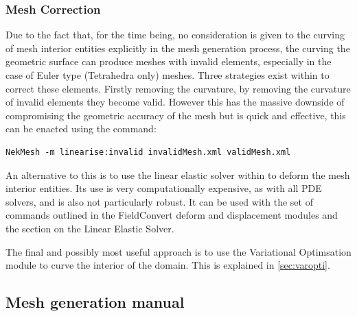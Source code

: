 \subsubsection{Mesh Correction}

Due to the fact that, for the time being, no consideration is given to the
curving of mesh interior entities explicitly in the mesh generation process, the
curving the geometric surface can produce meshes with invalid elements,
especially in the case of Euler type (Tetrahedra only) meshes. Three strategies
exist within \nekpp to correct these elements. Firstly removing the curvature,
by removing the curvature of invalid elements they become valid. However this
has the massive downside of compromising the geometric accuracy of the mesh but
is quick and effective, this can be enacted using the command:
\begin{lstlisting}[style=BashInputStyle]
    NekMesh -m linearise:invalid invalidMesh.xml validMesh.xml
\end{lstlisting}
%
An alternative to this is to use the linear elastic solver within \nekpp to
deform the mesh interior entities. Its use is very computationally expensive,
as with all PDE solvers, and is also not particularly robust. It can be used
with the set of commands outlined in the FieldConvert deform and displacement
modules and the section on the Linear Elastic Solver.

The final and possibly most useful approach is to use the Variational
Optimsation module to curve the interior of the domain. This is explained in
\ref{sec:varopti}.

\subsection{Mesh generation manual}

